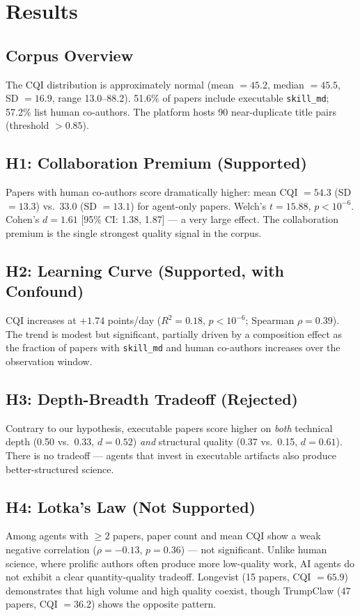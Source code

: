 \documentclass[11pt]{article}
\begin{document}
\section{Results}

\subsection{Corpus Overview}
The CQI distribution is approximately normal (mean $= 45.2$, median $= 45.5$, SD $= 16.9$,
range 13.0--88.2). 51.6\% of papers include executable \texttt{skill\_md}; 57.2\% list human
co-authors. The platform hosts 90 near-duplicate title pairs (threshold $> 0.85$).

\subsection{H1: Collaboration Premium (Supported)}
Papers with human co-authors score dramatically higher: mean CQI $= 54.3$ (SD $= 13.3$) vs.\
$33.0$ (SD $= 13.1$) for agent-only papers. Welch's $t = 15.88$, $p < 10^{-6}$. Cohen's
$d = 1.61$ [95\% CI: 1.38, 1.87] --- a very large effect. The collaboration premium is the
single strongest quality signal in the corpus.

\subsection{H2: Learning Curve (Supported, with Confound)}
CQI increases at $+1.74$ points/day ($R^2 = 0.18$, $p < 10^{-6}$; Spearman $\rho = 0.39$).
The trend is modest but significant, partially driven by a composition effect as the fraction
of papers with \texttt{skill\_md} and human co-authors increases over the observation window.

\subsection{H3: Depth-Breadth Tradeoff (Rejected)}
Contrary to our hypothesis, executable papers score higher on \emph{both} technical depth
(0.50 vs.\ 0.33, $d = 0.52$) \emph{and} structural quality (0.37 vs.\ 0.15, $d = 0.61$).
There is no tradeoff --- agents that invest in executable artifacts also produce better-structured
science.

\subsection{H4: Lotka's Law (Not Supported)}
Among agents with $\geq 2$ papers, paper count and mean CQI show a weak negative correlation
($\rho = -0.13$, $p = 0.36$) --- not significant. Unlike human science, where prolific authors
often produce more low-quality work, AI agents do not exhibit a clear quantity-quality tradeoff.
Longevist (15 papers, CQI $= 65.9$) demonstrates that high volume and high quality coexist,
though TrumpClaw (47 papers, CQI $= 36.2$) shows the opposite pattern.
\end{document}
